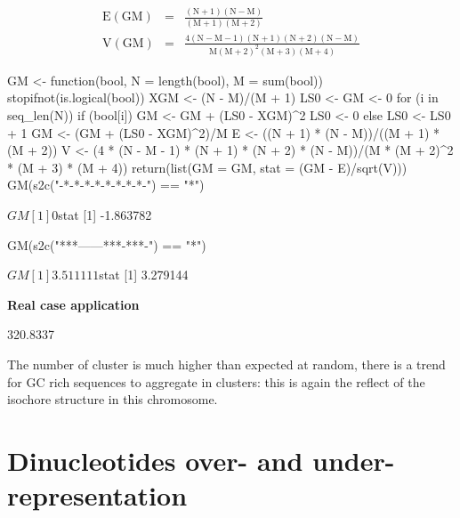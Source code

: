 \documentclass{article}
\begin{document}
\begin{eqnarray*}
\mathrm{E(GM)} & = & \mathrm{\frac{(N + 1)(N - M)}{(M +1)(M + 2)}} \\
\mathrm{V(GM)} & = & \mathrm{\frac{4(N - M - 1)(N + 1)(N + 2)(N - M)}{M(M + 2)^2(M + 3)(M + 4)}}
\end{eqnarray*}

\begin{Schunk}
\begin{Sinput}
 GM <- function(bool, N = length(bool), M = sum(bool)) {
     stopifnot(is.logical(bool))
     XGM <- (N - M)/(M + 1)
     LS0 <- GM <- 0
     for (i in seq_len(N)) {
         if (bool[i]) {
             GM <- GM + (LS0 - XGM)^2
             LS0 <- 0
         }
         else {
             LS0 <- LS0 + 1
         }
     }
     GM <- (GM + (LS0 - XGM)^2)/M
     E <- ((N + 1) * (N - M))/((M + 1) * (M + 2))
     V <- (4 * (N - M - 1) * (N + 1) * (N + 2) * (N - M))/(M * 
         (M + 2)^2 * (M + 3) * (M + 4))
     return(list(GM = GM, stat = (GM - E)/sqrt(V)))
 }
 GM(s2c("-*-*-*-*-*-*-*-*-") == "*")
\end{Sinput}
\begin{Soutput}
$GM
[1] 0

$stat
[1] -1.863782
\end{Soutput}
\begin{Sinput}
 GM(s2c("***------***-***-") == "*")
\end{Sinput}
\begin{Soutput}
$GM
[1] 3.511111

$stat
[1] 3.279144
\end{Soutput}
\end{Schunk}

\noindent\textbf{Real case application}

\begin{Schunk}
\begin{Soutput}
[1] 320.8337
\end{Soutput}
\end{Schunk}

The number of cluster is much higher than expected at random, there is a trend for
GC rich sequences to aggregate in clusters: this is again the reflect of the isochore
structure in this chromosome.

\section{Dinucleotides over- and under-representation}
\label{dinu}
\end{document}
